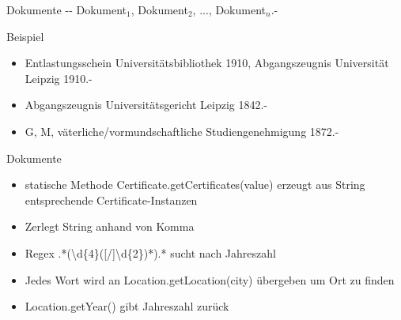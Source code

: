 \documentclass[12pt]{beamer}
\begin{document}
\begin{large}
\begin{frame}{Dokumente}
 -{}- Dokument$_1$, Dokument$_2$, ..., Dokument$_n$.-

 \vspace*{\fill}
 \begin{block}{Beispiel}
  \normalsize
  \begin{itemize}
   \item Entlastungsschein Universitätsbibliothek 1910, Abgangszeugnis Universität Leipzig 1910.-
   \item Abgangszeugnis Universitätsgericht Leipzig 1842.-
   \item G, M, väterliche/vormundschaftliche Studiengenehmigung 1872.-
  \end{itemize}
 \end{block}
\end{frame}


\begin{frame}{Dokumente}
 \begin{itemize}
  \item statische Methode Certificate.getCertificates(value) erzeugt aus String entsprechende Certificate-Instanzen
  \item Zerlegt String anhand von Komma
  \item Regex .*(\textbackslash d\{4\}([/]\textbackslash d\{2\})*).* sucht nach Jahreszahl
  \item Jedes Wort wird an Location.getLocation(city) übergeben um Ort zu finden
  \item Location.getYear() gibt Jahreszahl zurück
 \end{itemize}
\end{frame}



\end{large}
\end{document}
